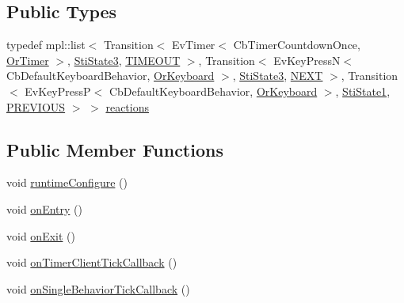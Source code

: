\subsection*{Public Types}
\begin{DoxyCompactItemize}
\item 
typedef mpl\+::list$<$ Transition$<$ Ev\+Timer$<$ Cb\+Timer\+Countdown\+Once, \hyperlink{classsm__starcraft__ai_1_1OrTimer}{Or\+Timer} $>$, \hyperlink{structsm__starcraft__ai_1_1inner__states_1_1StiState3}{Sti\+State3}, \hyperlink{structsm__starcraft__ai_1_1inner__states_1_1StiState2_1_1TIMEOUT}{T\+I\+M\+E\+O\+UT} $>$, Transition$<$ Ev\+Key\+PressN$<$ Cb\+Default\+Keyboard\+Behavior, \hyperlink{classsm__starcraft__ai_1_1OrKeyboard}{Or\+Keyboard} $>$, \hyperlink{structsm__starcraft__ai_1_1inner__states_1_1StiState3}{Sti\+State3}, \hyperlink{structsm__starcraft__ai_1_1inner__states_1_1StiState2_1_1NEXT}{N\+E\+XT} $>$, Transition$<$ Ev\+Key\+PressP$<$ Cb\+Default\+Keyboard\+Behavior, \hyperlink{classsm__starcraft__ai_1_1OrKeyboard}{Or\+Keyboard} $>$, \hyperlink{structsm__starcraft__ai_1_1inner__states_1_1StiState1}{Sti\+State1}, \hyperlink{structsm__starcraft__ai_1_1inner__states_1_1StiState2_1_1PREVIOUS}{P\+R\+E\+V\+I\+O\+US} $>$ $>$ \hyperlink{structsm__starcraft__ai_1_1inner__states_1_1StiState2_a079968fbf464cd41dfa8504c5aa3cad1}{reactions}
\end{DoxyCompactItemize}
\subsection*{Public Member Functions}
\begin{DoxyCompactItemize}
\item 
void \hyperlink{structsm__starcraft__ai_1_1inner__states_1_1StiState2_a5ae78a52b1c1b03bc68a2a76645a261e}{runtime\+Configure} ()
\item 
void \hyperlink{structsm__starcraft__ai_1_1inner__states_1_1StiState2_a1c0c28a8e398cd3352b8f7369fe3fc86}{on\+Entry} ()
\item 
void \hyperlink{structsm__starcraft__ai_1_1inner__states_1_1StiState2_a5711e053587f7da3e65952201065164c}{on\+Exit} ()
\item 
void \hyperlink{structsm__starcraft__ai_1_1inner__states_1_1StiState2_a04c8288ab95f7ffc33f70d835bebe1bd}{on\+Timer\+Client\+Tick\+Callback} ()
\item 
void \hyperlink{structsm__starcraft__ai_1_1inner__states_1_1StiState2_a6d94b2cc5478111a4399d6b3fd49a823}{on\+Single\+Behavior\+Tick\+Callback} ()
\end{DoxyCompactItemize}

